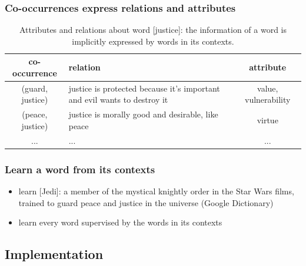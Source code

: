 \documentclass{article}
\begin{document}
\subsubsection{Co-occurrences express relations and attributes}
\begin{table}[H]
	\centering
	\begin{tabularx}{\textwidth}{|c|X|c|} \hline
		co-occurrence & relation & attribute \\ \hline
		(guard, justice) & justice is protected because it's important and evil 
		wants to destroy it & value, vulnerability \\ \hline
		(peace, justice) & justice is morally good and desirable, like peace & 
		virtue \\ \hline
		... & ... & ... \\ \hline
	\end{tabularx}
	\caption{Attributes and relations about word [justice]: the information of 
	a word is implicitly expressed by words in its contexts.}
	\label{tab:cooccurrences}
\end{table}
\subsubsection{Learn a word from its contexts}
\begin{itemize}
	\item learn [Jedi]: a member of the mystical knightly order in the Star 
	Wars films, trained to guard peace and justice in the universe (Google 
	Dictionary)
	\item learn every word supervised by the words in its contexts
\end{itemize}

\subsection{Implementation}
\end{document}

